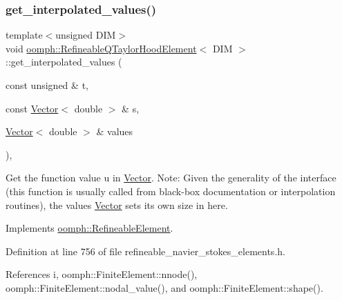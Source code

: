 \subsubsection{\texorpdfstring{get\+\_\+interpolated\+\_\+values()}{get\_interpolated\_values()}\hspace{0.1cm}{\footnotesize\ttfamily [2/2]}}
{\footnotesize\ttfamily template$<$unsigned D\+IM$>$ \\
void \hyperlink{classoomph_1_1RefineableQTaylorHoodElement}{oomph\+::\+Refineable\+Q\+Taylor\+Hood\+Element}$<$ D\+IM $>$\+::get\+\_\+interpolated\+\_\+values (\begin{DoxyParamCaption}\item[{const unsigned \&}]{t,  }\item[{const \hyperlink{classoomph_1_1Vector}{Vector}$<$ double $>$ \&}]{s,  }\item[{\hyperlink{classoomph_1_1Vector}{Vector}$<$ double $>$ \&}]{values }\end{DoxyParamCaption})\hspace{0.3cm}{\ttfamily [inline]}, {\ttfamily [virtual]}}



Get the function value u in \hyperlink{classoomph_1_1Vector}{Vector}. Note\+: Given the generality of the interface (this function is usually called from black-\/box documentation or interpolation routines), the values \hyperlink{classoomph_1_1Vector}{Vector} sets its own size in here. 



Implements \hyperlink{classoomph_1_1RefineableElement_ada6f0efe831ffefb1d2829ce01d45bfc}{oomph\+::\+Refineable\+Element}.



Definition at line 756 of file refineable\+\_\+navier\+\_\+stokes\+\_\+elements.\+h.



References i, oomph\+::\+Finite\+Element\+::nnode(), oomph\+::\+Finite\+Element\+::nodal\+\_\+value(), and oomph\+::\+Finite\+Element\+::shape().

\mbox{\label{classoomph_1_1RefineableQTaylorHoodElement_abc2fe9fc2b519cbe96d2be48fe092db0}} 
